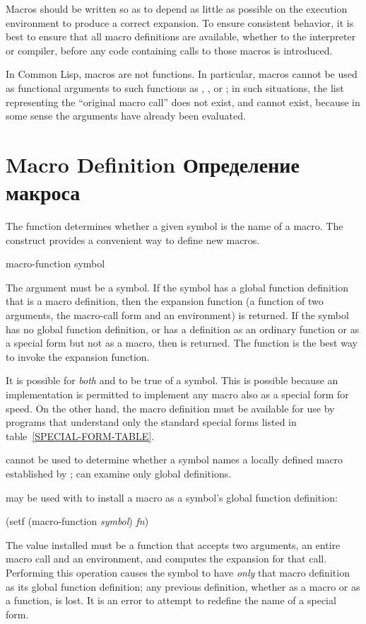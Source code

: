 Macros should be written so as to depend as little as possible
on the execution environment to produce a correct expansion.  To ensure
consistent behavior, it is best to ensure that all macro definitions are
available, whether to the interpreter or compiler, before any code
containing calls to those macros is introduced.

In Common Lisp, macros are not functions.
In particular, macros cannot be used as
functional arguments to such functions as , ,
or ; in such situations, the list representing the ``original macro
call'' does not exist, and cannot exist, because in some sense the arguments
have already been evaluated.

\section{Macro Definition Определение макроса}

The function  determines whether a given symbol
is the name of a macro.  The  construct provides
a convenient way to define new macros.

\begin{obsolete}
\begin{defun}[Function]
macro-function symbol

The argument must be a symbol.  If the symbol has a global function definition
that is a macro definition, then the expansion function
(a function of two arguments, the macro-call form and an environment)
is returned.
If the symbol has no global function definition, or has a definition
as an ordinary function or as a special form but not as a macro, then
{\false} is returned.  The function 
is the best way to invoke the expansion function.

It is possible for \emph{both}  and 
to be true of a symbol.  This is possible because an implementation is
permitted to implement any macro also as a special form for speed.
On the other hand, the macro definition must be available
for use by programs that understand only the standard special forms
listed in table~\ref{SPECIAL-FORM-TABLE}.

 cannot be used to determine whether a symbol names
a locally defined macro established by ;
 can
examine only global definitions.

 may be used with  to install
a macro as a symbol's global function definition:
\begin{lisp}
(setf (macro-function \emph{symbol}) \emph{fn})
\end{lisp}
The value installed must be a function that accepts two arguments,
an entire macro call and an environment, and computes the expansion for that call.
Performing this operation causes the symbol to have \emph{only} that
macro definition as its global function definition; any previous
definition, whether as a macro or as a function, is lost.
It is an error to attempt to redefine the name of a special
form.
\end{defun}
\end{obsolete}

